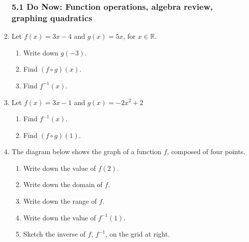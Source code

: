 \documentclass[12pt, twoside]{article}
\begin{document}
\begin{enumerate}[itemsep=0.5cm]
    \subsubsection*{5.1 Do Now: Function operations, algebra review, graphing quadratics}

    \item Let $f(x)=3x-4$ and $g(x)=5x$, for $x \in \mathbb{R}$.
    \begin{enumerate}[itemsep=1cm]
      \item Write down $g(-3)$.
      \item Find $(f \circ g)(x)$.
      \item Find $f^{-1}(x)$.\vspace{1.5cm}
    \end{enumerate}

    \item Let $f(x)=3x-1$ and $g(x)=-2x^2+2$
    \begin{enumerate}[itemsep=1.5cm]
        \item Find $f^{-1}(x)$.
        \item Find $(f \circ g)(1)$.\vspace{2.5cm}
    \end{enumerate}


\item The diagram below shows the graph of a function $f$, composed of four points.
\begin{multicols}{2}
    \begin{enumerate}[itemsep=0.5cm]
        \item Write down the value of $f(2)$.
        \item Write down the domain of $f$.
        \item Write down the range of $f$.
        \item Write down the value of $f^{-1}(1)$.
        \item Sketch the inverse of $f$, $f^{-1}$, on the grid at right. \vspace{0.5cm}
    \end{enumerate}
\end{multicols}
\end{enumerate}
\end{document}
